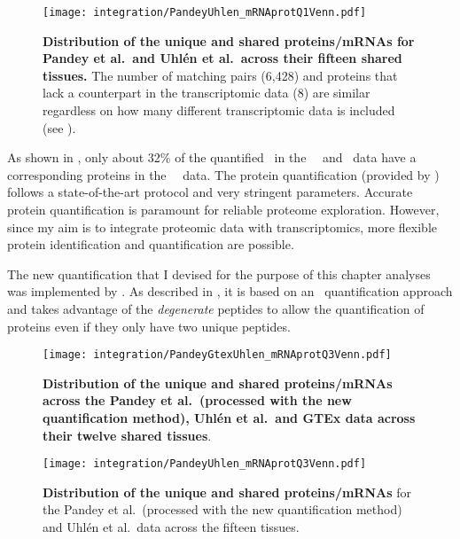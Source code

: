 \begin{figure}[!htpb]
    \texttt{[image: integration/PandeyUhlen\_mRNAprotQ1Venn.pdf]}\centering
    \vspace{-3.5mm}
    \caption[Distribution of the unique and shared proteins/mRNAs for Pandey et al.\
    and Uhlén et al.\ across fifteen tissues.]{%
    \label{fig:PU_vennQ1}\textbf{Distribution of the unique and shared proteins/mRNAs
    for Pandey et al.\ and Uhlén et al.\ across their fifteen shared tissues.}
    The number of matching pairs (6,428) and proteins that lack a counterpart in
    the transcriptomic data (8) are similar regardless on how many different
    transcriptomic data is included (see \Cref{fig:PGU_vennQ1}).}
\end{figure}

As shown in ,
only about 32\% of the quantified \mRNAs\ in the \uhlen\ \etal\ and \gtex\ data
have a corresponding proteins in the \pandey\ \etal\ data.
The protein quantification (provided by \james) follows
a state-of-the-art protocol and very stringent parameters.
Accurate protein quantification is paramount for reliable proteome exploration.
However, since my aim is to integrate proteomic data with transcriptomics,
more flexible protein identification and quantification are possible.

The new quantification that I devised for the purpose of this chapter analyses
was implemented by \james.
As described in ,
it is based on an \Rnaseq\ quantification approach and
takes advantage of the \emph{degenerate} peptides
to allow the quantification of proteins
even if they only have two unique peptides.

\begin{figure}[!ht]
    \texttt{[image: integration/PandeyGtexUhlen\_mRNAprotQ3Venn.pdf]}\centering
    \vspace{-4mm}
    \caption[Distribution of the unique and shared proteins/mRNAs
    across the three datasets and twelve tissues
    (with the new protein quantification method)]{\label{fig:PGU_venQ3}%
    \textbf{Distribution of the unique and shared proteins/mRNAs
    across the Pandey et al.\ (processed with the new quantification method),
    Uhlén et al.\ and GTEx data across their twelve shared tissues}.
    }
\end{figure}

\begin{figure}[!ht]
    \texttt{[image: integration/PandeyUhlen\_mRNAprotQ3Venn.pdf]}\centering
    \vspace{-4mm}
    \caption[Distribution of the unique and shared proteins/mRNAs for the
    Pandey et al.\ (processed with the new quantification method) and Uhlén et al.\ data
    across the fifteen tissues.
    ]{\label{fig:PU_vennQ3}\textbf{Distribution of the
    unique and shared proteins/mRNAs} for
    the Pandey et al.\ (processed with the new quantification method)
    and Uhlén et al.\ data across the fifteen tissues.}
\end{figure}

